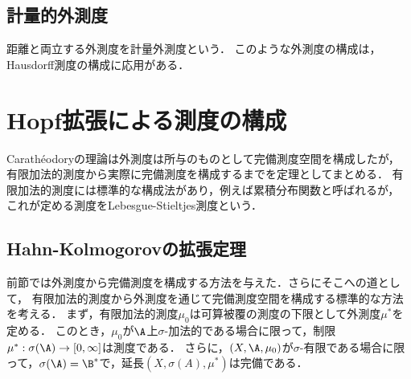 \documentclass[uplatex, dvipdfmx]{jsreport}
\begin{document}
\subsection{計量的外測度}

\begin{tcolorbox}[colframe=ForestGreen, colback=ForestGreen!10!white,breakable,colbacktitle=ForestGreen!40!white,coltitle=black,fonttitle=\bfseries\sffamily,
title=]
    距離と両立する外測度を計量外測度という．
    このような外測度の構成は，Hausdorff測度の構成に応用がある．
\end{tcolorbox}

\section{Hopf拡張による測度の構成}

\begin{tcolorbox}[colframe=ForestGreen, colback=ForestGreen!10!white,breakable,colbacktitle=ForestGreen!40!white,coltitle=black,fonttitle=\bfseries\sffamily,
title=]
    Carathéodoryの理論は外測度は所与のものとして完備測度空間を構成したが，
    有限加法的測度から実際に完備測度を構成するまでを定理としてまとめる．
    有限加法的測度には標準的な構成法があり，例えば累積分布関数と呼ばれるが，
    これが定める測度をLebesgue-Stieltjes測度という．
\end{tcolorbox}

\subsection{Hahn-Kolmogorovの拡張定理}

\begin{tcolorbox}[colframe=ForestGreen, colback=ForestGreen!10!white,breakable,colbacktitle=ForestGreen!40!white,coltitle=black,fonttitle=\bfseries\sffamily,
title=Hahn-Kolmogorovの拡張定理]
    前節では外測度から完備測度を構成する方法を与えた．さらにそこへの道として，
    有限加法的測度から外測度を通じて完備測度空間を構成する標準的な方法を考える．
    まず，有限加法的測度$\mu_0$は可算被覆の測度の下限として外測度$\mu^*$を定める．
    このとき，$\mu_0$が$\A$上$\sigma$-加法的である場合に限って，制限$\mu^*:\sigma(\A)\to[0,\infty]$は測度である．
    さらに，$(X,\A,\mu_0)$が$\sigma$-有限である場合に限って，$\sigma(\A)=\B^*$で，延長$(X,\sigma(A),\mu^*)$は完備である．
\end{tcolorbox}
\end{document}
